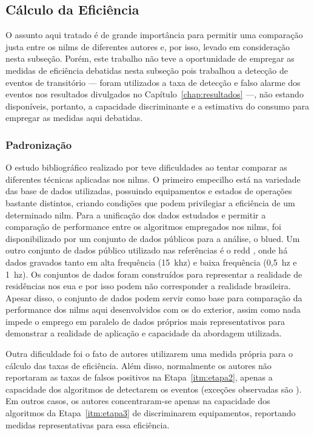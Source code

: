 \subsection{Cálculo da Eficiência}
\label{ssec:nilm_eff_calc}

O assunto aqui tratado é de grande importância para permitir uma
comparação justa entre os \glspl{nilm} de diferentes autores e, por
isso, levado em consideração nesta subseção.
Porém, este trabalho não teve a oportunidade de empregar as medidas de
eficiência debatidas nesta subseção pois trabalhou a detecção de
eventos de transitório --- foram utilizados a taxa de detecção e falso
alarme dos eventos nos resultados divulgados no
Capítulo~\ref{chap:resultados} ---, não estando disponíveis, portanto,
a capacidade discriminante e a estimativa do consumo para empregar as
medidas aqui debatidas.

\subsubsection{Padronização}
\label{top:nilm_padrao}

O estudo bibliográfico realizado por \cite{nilm_zeifman_review_2011}
teve dificuldades ao tentar comparar as diferentes técnicas aplicadas
nos \glspl{nilm}. O primeiro empecilho está na variedade das base
de dados utilizadas, possuindo equipamentos e estados de operações
bastante distintos, criando condições que podem privilegiar a
eficiência de um determinado \gls{nilm}. Para a unificação dos dados
estudados e permitir a comparação de performance entre os algoritmos
empregados nos \glspl{nilm}, foi disponibilizado por
\cite{nilm_dataset_blued_2012} um conjunto de dados públicos para
a análise, o \acs{blued}. Um outro conjunto de dados público
utilizado nas referências é o \acs{redd}
\cite{nilm_dataset_redd_2011}, onde há dados gravados tanto em alta
frequência (15~k\acs{hz}) e baixa frequência (0,5~\acs{hz} e
1~\acs{hz}). Os conjuntos de dados foram construídos para
representar a realidade de residências nos \gls{eua} e por isso podem
não corresponder a realidade brasileira. Apesar disso, o conjunto
de dados podem servir como base para comparação da performance dos
\glspl{nilm} aqui desenvolvidos com os do exterior, assim como nada
impede o emprego em paralelo de dados próprios mais representativos
para demonstrar a realidade de aplicação e capacidade da abordagem
utilizada.

Outra dificuldade foi o fato de autores utilizarem uma
medida própria para o cálculo das taxas de eficiência.  Além disso,
normalmente os autores não reportaram as taxas de falsos positivos na
Etapa~\ref{itm:etapa2}, apenas a capacidade dos algoritmos de
detectarem os eventos (exceções observadas são
\cite{nilm_marceau_16ssamp_improved_1999_18,nilm_liang_pt2_2010_40}).
Em outros casos, os autores concentraram-se apenas na capacidade dos
algoritmos da Etapa~\ref{itm:etapa3} de discriminarem equipamentos,
reportando medidas representativas para essa eficiência.

